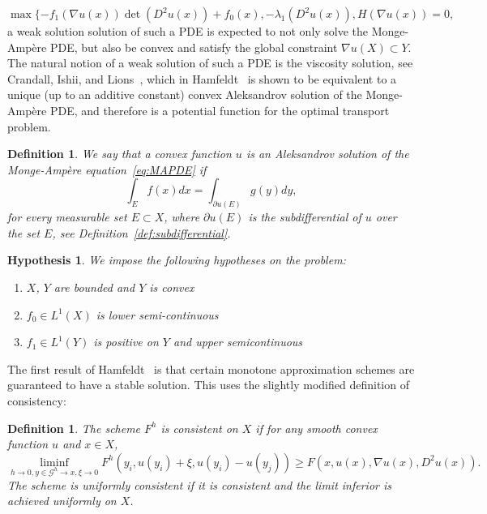 \documentclass{amsart}
\theoremstyle{lemma}
\newtheorem{definition}[theorem]{Definition}
\newtheorem{hypothesis}[theorem]{Hypothesis}
\theoremstyle{remark}
\begin{document}
\begin{equation}
\max \{ -f_1(\nabla u(x)) \det (D^2 u(x)) + f_0(x), - \lambda_1 (D^2 u(x)), H(\nabla u(x)) = 0,
\end{equation}
a weak solution solution of such a PDE is expected to not only solve the Monge-Amp\`{e}re PDE, but also be convex and satisfy the global constraint $\nabla u(X) \subset Y$. The natural notion of a weak solution of such a PDE is the viscosity solution, see Crandall, Ishii, and Lions~\cite{CIL}, which in Hamfeldt~\cite{HamfeldtBVP2} is shown to be equivalent to a unique (up to an additive constant) convex Aleksandrov solution of the Monge-Amp\`{e}re PDE, and therefore is a potential function for the optimal transport problem.

\begin{definition}
We say that a convex function $u$ is an Aleksandrov solution of the Monge-Amp\`{e}re equation~\eqref{eq:MAPDE} if
\begin{equation}
\int_{E} f(x)dx = \int_{\partial u(E)} g(y)dy,
\end{equation}
for every measurable set $E \subset X$, where $\partial u(E)$ is the subdifferential of $u$ over the set $E$, see Definition~\ref{def:subdifferential}.
\end{definition}

\begin{hypothesis}
We impose the following hypotheses on the problem:
\begin{enumerate}
\item $X$, $Y$ are bounded and $Y$ is convex
\item $f_0 \in L^1(X)$ is lower semi-continuous
\item $f_1 \in L^1(Y)$ is positive on $Y$ and upper semicontinuous
\end{enumerate}
\end{hypothesis}

The first result of Hamfeldt~\cite{HamfeldtBVP2} is that certain monotone approximation schemes are guaranteed to have a stable solution. This uses the slightly modified definition of consistency:
\begin{definition}
The scheme $F^h$ is consistent on $X$ if for any smooth convex function $u$ and $x \in X$,
\begin{equation}
\liminf_{h \rightarrow 0, y \in \mathcal{G}^h \rightarrow x, \xi \rightarrow 0} F^h(y_i, u(y_i) + \xi, u(y_i) - u(y_j)) \geq F(x, u(x), \nabla u(x), D^2 u(x)).
\end{equation}
The scheme is uniformly consistent if it is consistent and the limit inferior is achieved uniformly on $X$.
\end{definition}
\end{document}
